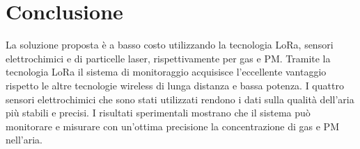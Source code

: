 \documentclass[a4paper]{report} %
\begin{document}
\section{Conclusione}
La soluzione proposta è a basso costo utilizzando la tecnologia LoRa, sensori elettrochimici e di particelle laser, rispettivamente per gas e PM. Tramite la tecnologia LoRa il sistema di monitoraggio acquisisce l'eccellente vantaggio rispetto le altre tecnologie wireless di lunga distanza e bassa potenza. I quattro sensori elettrochimici che sono stati utilizzati rendono i dati sulla qualità dell'aria più stabili e precisi. I risultati sperimentali mostrano che il sistema può monitorare e misurare con un'ottima precisione la concentrazione di gas e PM nell'aria.



\end{document}
